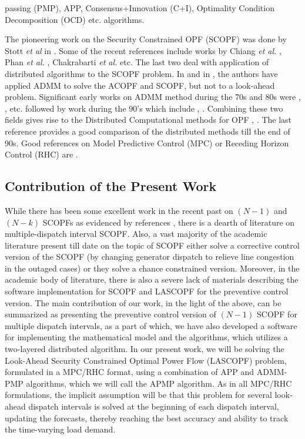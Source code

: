 \documentclass[preprint,12pt,3p]{elsarticle}
\begin{document}
passing (PMP), APP, Consensus+Innovation (C+I), Optimality Condition Decomposition (OCD) etc. algorithms.
	
	The pioneering work on the Security Constrained OPF (SCOPF) was done by Stott \emph{et al} in \cite{1458198}. Some of the recent references include works by Chiang \emph{et al.} \cite{CG:11}, Phan \emph{et al.} \cite{PK:12}, Chakrabarti \emph{et al.} \cite{CK:14} etc. The last two deal with application of distributed algorithms to the SCOPF problem. In \cite{E:14} and in \cite{LKWZ:13}, the authors have applied ADMM to solve the ACOPF and SCOPF, but not to a look-ahead problem. Significant early works on ADMM method during the 70s and 80s were \cite{GlM:75}, \cite{Gab:83}, \cite{FG:83} etc. followed by work during the 90's which include \cite{EF:93}, \cite{Eck:94b}. Combining these two fields gives rise to the Distributed Computational methods for OPF \cite{KB:97}, \cite{KB:00}. The last reference provides a good comparison of the distributed methods till the end of 90s. Good references on Model Predictive Control (MPC) or Receding Horizon Control (RHC) are \cite{QB:03,CTHK:03,Her:05,TR:04,KW:11}. \subsection{Contribution of the Present Work}While there has been some excellent work in the recent past on $(N-1)$ and $(N-k)$ SCOPFs as evidenced by references \cite{capitanescu2011state, lubin2015robust, amjady2011security, la1998line, articleSCOPF}, there is a dearth of literature on multiple-dispatch interval SCOPF. Also, a vast majority of the academic literature present till date on the topic of SCOPF either solve a corrective control version of the SCOPF (by changing generator dispatch to relieve line congestion in the outaged cases) or they solve a chance constrained version. Moreover, in the academic body of literature, there is also a severe lack of materials describing the software implementation for SCOPF and LASCOPF for the preventive control version. The main contribution of our work, in the light of the above, can be summarized as presenting the preventive control version of $(N-1)$ SCOPF for multiple dispatch intervals, as a part of which, we have also developed a software for implementing the mathematical model and the algorithms, which utilizes a two-layered distributed algorithm. In our present work, we will be solving the Look-Ahead Security Constrained Optimal Power Flow (LASCOPF) problem, formulated in a MPC/RHC format, using a combination of APP and ADMM-PMP algorithms, which we will call the APMP algorithm. As in all MPC/RHC formulations, the implicit assumption will be that this problem for several look-ahead dispatch intervals is solved at the beginning of each dispatch interval, updating the forecasts, thereby reaching the best accuracy and ability to track the time-varying load demand.
\end{document}
